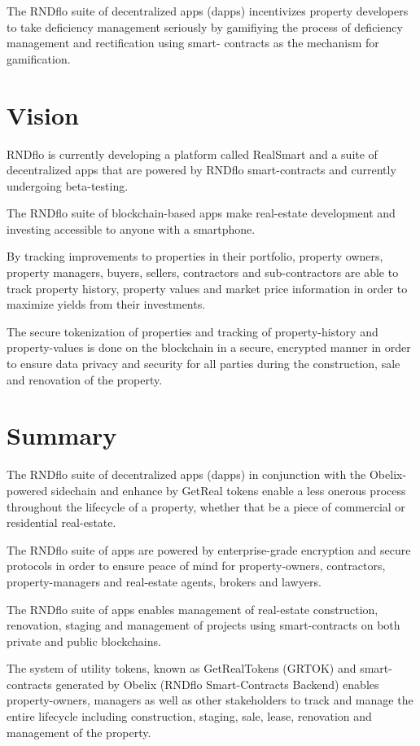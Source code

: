 \documentclass{article}
\begin{document}
The RNDflo suite of decentralized apps (dapps) incentivizes property developers to take 
deficiency management seriously by gamifiying the process of deficiency management and 
rectification using smart- contracts as the mechanism for gamification.


\section{Vision}

RNDflo is currently developing a platform called RealSmart and a suite of decentralized apps that are powered by RNDflo smart-contracts and currently undergoing beta-testing.


The RNDflo suite of blockchain-based apps make real-estate development and investing accessible to anyone with a smartphone.


By tracking improvements to properties in their portfolio, property owners, property managers, buyers, sellers, contractors 
and sub-contractors are able to track property history, property values and market price information in 
order to maximize yields from their investments.


The secure tokenization of properties and tracking of property-history and property-values is 
done on the blockchain in a secure, encrypted manner in order to ensure data privacy and security for all parties 
during the construction, sale and renovation of the property.

\section{Summary}

The RNDflo suite of decentralized apps (dapps) in conjunction with the Obelix-powered sidechain and 
enhance by GetReal tokens enable a less onerous process throughout the lifecycle of a property, 
whether that be a piece of commercial or residential real-estate.


The RNDflo suite of apps are powered by enterprise-grade encryption and secure protocols in order 
to ensure peace of mind for property-owners, contractors, property-managers and real-estate agents, brokers and lawyers.


The RNDflo suite of apps enables management of real-estate construction, renovation, staging and management 
of projects using smart-contracts on both private and public blockchains.


The system of utility tokens, known as GetRealTokens (GRTOK) and smart- contracts generated 
by Obelix (RNDflo Smart-Contracts Backend) enables property-owners, managers as well as other 
stakeholders to track and manage the entire lifecycle including construction, staging, sale, lease, 
renovation and management of the property.
\end{document}
